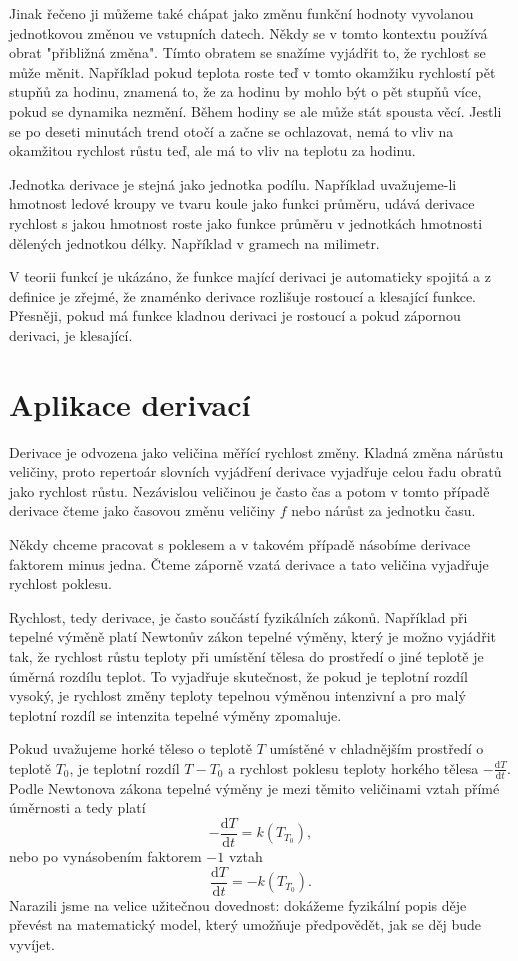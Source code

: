 \documentclass[12pt]{article}
\begin{document}
Jinak řečeno ji můžeme také chápat jako změnu funkční hodnoty vyvolanou jednotkovou změnou ve vstupních datech. Někdy se v tomto kontextu používá obrat "přibližná změna". Tímto obratem se snažíme vyjádřit to, že rychlost se může měnit. Například pokud teplota roste teď v tomto okamžiku rychlostí pět stupňů za hodinu, znamená to, že za hodinu by mohlo být o pět stupňů více, pokud se dynamika nezmění. Během hodiny se ale může stát spousta věcí. Jestli se po deseti minutách trend otočí a začne se ochlazovat, nemá to vliv na okamžitou rychlost růstu teď, ale má to vliv na teplotu za hodinu.

Jednotka derivace je stejná jako jednotka podílu. Například uvažujeme-li hmotnost ledové kroupy ve tvaru koule jako funkci průměru, udává derivace rychlost s jakou hmotnost roste jako funkce průměru v jednotkách hmotnosti dělených jednotkou délky. Například v gramech na milimetr.

V teorii funkcí je ukázáno, že funkce mající derivaci je automaticky spojitá a z definice je zřejmé, že znaménko derivace rozlišuje rostoucí a klesající funkce. Přesněji, pokud má funkce kladnou derivaci je rostoucí a pokud zápornou derivaci, je klesající.

\section*{Aplikace derivací}

Derivace je odvozena jako veličina měřící rychlost změny. Kladná změna nárůstu veličiny, proto repertoár slovních vyjádření derivace vyjadřuje celou řadu obratů jako rychlost růstu. Nezávislou veličinou je často čas a potom v tomto případě derivace čteme jako časovou změnu veličiny $f$ nebo nárůst za jednotku času.

Někdy chceme pracovat s poklesem a v takovém případě násobíme derivace faktorem minus jedna. Čteme záporně vzatá derivace a tato veličina vyjadřuje rychlost poklesu.

Rychlost, tedy derivace, je často součástí fyzikálních zákonů. Například při tepelné výměně platí Newtonův zákon tepelné výměny, který je možno vyjádřit tak, že rychlost růstu teploty při umístění tělesa do prostředí o jiné teplotě je úměrná rozdílu teplot. To vyjadřuje skutečnost, že pokud je teplotní rozdíl vysoký, je rychlost změny teploty tepelnou výměnou intenzivní a pro malý teplotní rozdíl se intenzita tepelné výměny zpomaluje. 

Pokud uvažujeme horké těleso o teplotě $T$ umístěné v chladnějším prostředí o teplotě $T_0$, je teplotní rozdíl $T-T_0$ a rychlost poklesu teploty horkého tělesa $-\frac{\mathrm dT}{\mathrm dt}.$ Podle Newtonova zákona tepelné výměny je mezi těmito veličinami vztah přímé úměrnosti a tedy platí $$-\frac {\mathrm dT}{\mathrm dt}=k(T_T_0),$$
nebo po vynásobením faktorem $-1$ vztah
$$\frac {\mathrm dT}{\mathrm dt}=-k(T_T_0).$$ Narazili jsme na velice užitečnou dovednost: dokážeme fyzikální popis děje převést na matematický model, který umožňuje předpovědět, jak se děj bude vyvíjet.
\end{document}
